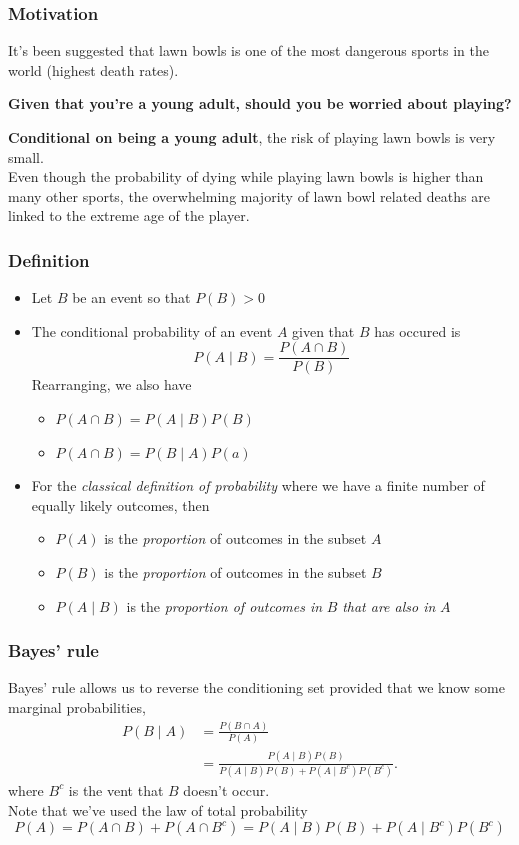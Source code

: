 \documentclass[a4paper]{article}
\begin{document}
\subsubsection{Motivation}
It's been suggested that lawn bowls is one of the most dangerous sports in the world (highest death rates).
\begin{greenbox}
	\textbf{Given that you're a young adult, should you be worried about playing?}
\end{greenbox}
\textbf{Conditional on being a young adult}, the risk of playing lawn bowls is very small.\\
Even though the probability of dying while playing lawn bowls is higher than many other sports, the overwhelming majority of lawn bowl related deaths are linked to the extreme age of the player.
\subsubsection{Definition}
\begin{itemize}
	\item Let \( B \) be an event so that \( P(B) > 0 \)
	\item The conditional probability of an event \( A \) given that \( B \) has occured is
	\[
		P(A \mid B) = \frac{P(A \cap B)}{P(B)}
	\]
	Rearranging, we also have
	\begin{itemize}
		\item \( P(A \cap B) = P(A \mid B)P(B) \) 
		\item \( P(A \cap B) = P(B \mid A)P(a) \) 
	\end{itemize}
	\item For the \textit{classical definition of probability} where we have a finite number of equally likely outcomes, then
	\begin{itemize}
		\item \( P(A) \) is the \textit{proportion} of outcomes in the subset \( A \) 
		\item \( P(B) \) is the \textit{proportion} of outcomes in the subset \( B \) 
		\item \( P(A \mid B) \) is the \textit{proportion of outcomes in} \( B \) \textit{that are also in} \( A \) 
	\end{itemize}
\end{itemize}
\subsubsection{Bayes' rule}
Bayes' rule allows us to reverse the conditioning set provided that we know some marginal probabilities,
\begin{align*}
		P(B \mid A) & = \frac{P(B\cap A)}{P(A)} \\
		& = \frac{P(A \mid B) P(B)}{P(A \mid B) P(B) + P(A \mid B^c)P(B^c)}.
\end{align*}
where \( B^{c} \) is the vent that \( B \) doesn't occur.\\
Note that we've used the \textcolor{myred}{law of total probability}
\[
	P(A) = P(A\cap B) + P(A\cap B^c) =  P(A \mid B) P(B) + P(A \mid B^c)P(B^c)
\]
\end{document}
